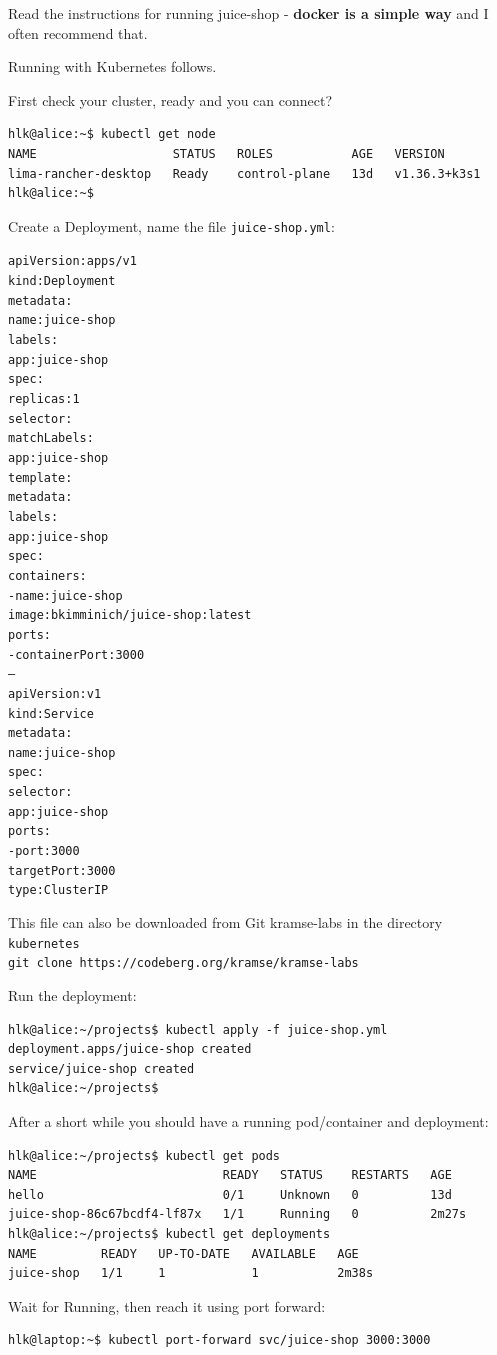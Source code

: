 \documentclass[a4paper,11pt,notitlepage]{report}
\begin{document}
Read the instructions for running juice-shop - {\bf docker is a simple way} and I often recommend that.

Running with Kubernetes follows.

First check your cluster, ready and you can connect?
\begin{verbatim}
hlk@alice:~$ kubectl get node
NAME                   STATUS   ROLES           AGE   VERSION
lima-rancher-desktop   Ready    control-plane   13d   v1.36.3+k3s1
hlk@alice:~$
\end{verbatim}

\eject
Create a Deployment, name the file \verb+juice-shop.yml+:
\begin{alltt}
apiVersion: apps/v1
kind: Deployment
metadata:
  name: juice-shop
  labels:
    app: juice-shop
spec:
  replicas: 1
  selector:
    matchLabels:
      app: juice-shop
  template:
    metadata:
      labels:
        app: juice-shop
    spec:
      containers:
        - name: juice-shop
          image: bkimminich/juice-shop:latest
          ports:
            - containerPort: 3000
---
apiVersion: v1
kind: Service
metadata:
  name: juice-shop
spec:
  selector:
    app: juice-shop
  ports:
    - port: 3000
      targetPort: 3000
  type: ClusterIP
\end{alltt}

This file can also be downloaded from Git kramse-labs in the directory \verb+kubernetes+\\
\verb+git clone https://codeberg.org/kramse/kramse-labs+

Run the deployment:
\begin{verbatim}
hlk@alice:~/projects$ kubectl apply -f juice-shop.yml
deployment.apps/juice-shop created
service/juice-shop created
hlk@alice:~/projects$
\end{verbatim}

\eject
After a short while you should have a running pod/container and deployment:
\begin{verbatim}
hlk@alice:~/projects$ kubectl get pods
NAME                          READY   STATUS    RESTARTS   AGE
hello                         0/1     Unknown   0          13d
juice-shop-86c67bcdf4-lf87x   1/1     Running   0          2m27s
hlk@alice:~/projects$ kubectl get deployments
NAME         READY   UP-TO-DATE   AVAILABLE   AGE
juice-shop   1/1     1            1           2m38s
\end{verbatim}


Wait for Running, then reach it using port forward:
\begin{verbatim}
hlk@laptop:~$ kubectl port-forward svc/juice-shop 3000:3000
\end{verbatim}
\end{document}
